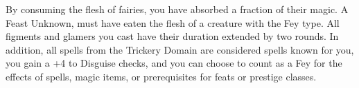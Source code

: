 \shortdescfeat
{By consuming the flesh of fairies, you have absorbed a fraction of their magic.}
{A Feast Unknown, must have eaten the flesh of a creature with the Fey type.}
{All figments and glamers you cast have their duration extended by two rounds. In addition, all spells from the Trickery Domain are considered spells known for you, you gain a +4 to Disguise checks, and you can choose to count as a Fey for the effects of spells, magic items, or prerequisites for feats or prestige classes.}

